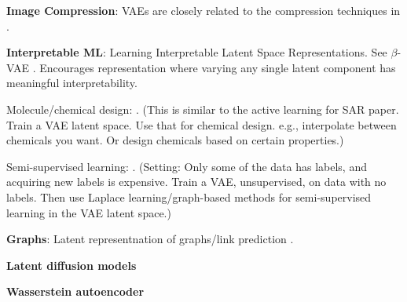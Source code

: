 \documentclass{article}
\begin{document}
\vspace{1em}
\noindent \textbf{Image Compression}:
VAEs are closely related to the compression techniques in \cite{balle2017end}.

\vspace{1em}
\noindent \textbf{Interpretable ML}:
Learning Interpretable Latent Space Representations. See $\beta$-VAE \cite{higgins2016beta}. Encourages representation where varying any single latent component has meaningful interpretability. 

\vspace{1em}
Molecule/chemical design: \cite{gomez2018automatic}. (This is similar to the active learning for SAR paper. Train a VAE latent space. Use that for chemical design. e.g., interpolate between chemicals you want. Or design chemicals based on certain properties.) 

\vspace{1em}
Semi-supervised learning: \cite{miller2022graph}. (Setting: Only some of the data has labels, and acquiring new labels is expensive. Train a VAE, unsupervised, on data with no labels. Then use Laplace learning/graph-based methods for semi-supervised learning in the VAE latent space.) 


\vspace{1em}
\noindent \textbf{Graphs}: Latent representnation of graphs/link prediction \cite{kipf2016variational}.

\vspace{1em}
\noindent \textbf{Latent diffusion models}

\vspace{1em}
\noindent \textbf{Wasserstein autoencoder} 




\end{document}
